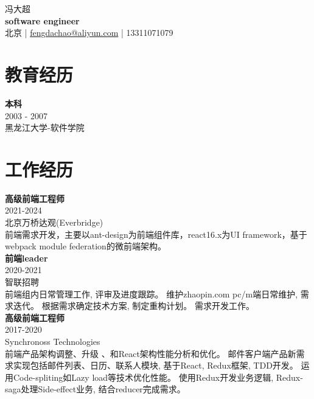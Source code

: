 \documentclass[a4paper,9pt]{extarticle}
\begin{document}
\pagestyle{empty}

\begin{center}
冯大超\\[3pt] %
\textbf{software engineer}\\[1pt] %
北京 | \href{mailto:fengdachao@aliyun.com}{fengdachao@aliyun.com} | 13311071079 %
\end{center}


\section*{教育经历}

\noindent
\newline
\textbf{本科} \\
2003 - 2007 \\ 
黑龙江大学-软件学院 \\


\section*{工作经历}
\noindent
\newline

\textbf{高级前端工程师} \\
2021-2024 \\
北京万桥达观(Everbridge) \\
前端需求开发，主要以ant-design为前端组件库，react16.x为UI framework，基于webpack module federation的微前端架构。\\

\textbf{前端leader} \\
2020-2021 \\
智联招聘 \\ 
前端组内日常管理工作, 评审及进度跟踪。 维护zhaopin.com pc/m端日常维护, 需求迭代。 根据需求确定技术方案, 制定重构计划。 需求开发工作。 \\ 

\noindent
\textbf{高级前端工程师} \\
2017-2020 \\
Synchronoss Technologies \\ 
前端产品架构调整、升级 、和React架构性能分析和优化。 邮件客户端产品新需求实现包括邮件列表、日历、联系人模块, 基于React, Redux框架, TDD开发。 运用Code-spliting如Lazy load等技术优化性能。 使用Redux开发业务逻辑, Redux-saga处理Side-effect业务, 结合reducer完成需求。
\end{document}
